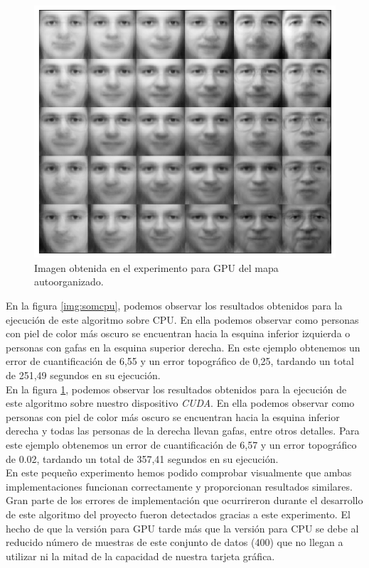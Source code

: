 \begin{figure}[ht]
\centering
\includegraphics[scale=0.3]{imagenes/facesgpu.png}
\caption{Imagen obtenida en el experimento para GPU del mapa autoorganizado.}
\label{img:somgpu}
\end{figure}

En la figura \ref{img:somcpu}, podemos observar los resultados obtenidos para la ejecución de este algoritmo sobre CPU. En ella podemos observar como personas con piel de color más oscuro se encuentran hacia la esquina inferior izquierda o personas con gafas en la esquina superior derecha. En este ejemplo obtenemos un error de cuantificación de 6,55 y un error topográfico de 0,25, tardando un total de 251,49 segundos en su ejecución.\\


En la figura \ref{img:somgpu}, podemos observar los resultados obtenidos para la ejecución de este algoritmo sobre nuestro dispositivo \textit{CUDA}. En ella podemos observar como personas con piel de color más oscuro se encuentran hacia la esquina inferior derecha y todas las personas de la derecha llevan gafas, entre otros detalles. Para este ejemplo obtenemos un error de cuantificación de 6,57 y un error topográfico de 0.02, tardando un total de 357,41 segundos en su ejecución.\\
	
En este pequeño experimento hemos podido comprobar visualmente que ambas implementaciones funcionan correctamente y proporcionan resultados similares. Gran parte de los errores de implementación que ocurrireron durante el desarrollo de este algoritmo del proyecto fueron detectados gracias a este experimento. El hecho de que la versión para GPU tarde más que la versión para CPU se debe al reducido número de muestras de este conjunto de datos (400) que no llegan a utilizar ni la mitad de la capacidad de nuestra tarjeta gráfica.

